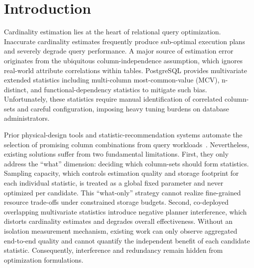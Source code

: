 \documentclass[sigconf, nonacm]{acmart}
\begin{document}
\maketitle

{\renewcommand\thefootnote{*}}
{\renewcommand\thefootnote{\textdagger}}

\vldbtopmatter

\section{Introduction}
\label{sec:intro}

Cardinality estimation lies at the heart of relational query optimization.
Inaccurate cardinality estimates frequently produce sub-optimal execution plans
and severely degrade query performance. A major source of estimation error
originates from the ubiquitous column-independence assumption, which ignores
real-world attribute correlations within tables. PostgreSQL provides
multivariate extended statistics including multi-column most-common-value (MCV),
n-distinct, and
functional-dependency statistics to mitigate such bias. Unfortunately, these
statistics require manual identification of correlated column-sets and careful
configuration, imposing heavy tuning burdens on database administrators.

Prior physical-design tools and statistic-recommendation systems automate the
selection of promising column combinations from query
workloads~\cite{chaudhuri1998autoadmin,kraft2004cords}. Nevertheless, existing
solutions suffer from two fundamental limitations. First, they only address the
``what'' dimension: deciding which column-sets should form statistics. Sampling
capacity, which controls estimation quality and storage footprint for each
individual statistic, is treated as a global fixed parameter and never
optimized per candidate. This ``what-only'' strategy cannot realize fine-grained
resource trade-offs under constrained storage budgets. Second, co-deployed
overlapping multivariate statistics introduce negative planner interference,
which distorts cardinality estimates and degrades overall effectiveness.
Without an isolation measurement mechanism, existing work can only observe
aggregated end-to-end quality and cannot quantify the independent benefit of
each candidate statistic. Consequently, interference and redundancy remain
hidden from optimization formulations.
\end{document}
